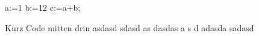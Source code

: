 \documentclass{article}
\begin{document}
 
\begin{tVar}
	a:=1
	b:=12
	c:=a+b;
\end{tVar}
Kurz Code mitten drin  asdasd  sdasd as dasdas a s d adasda sadasd
\end{document}
